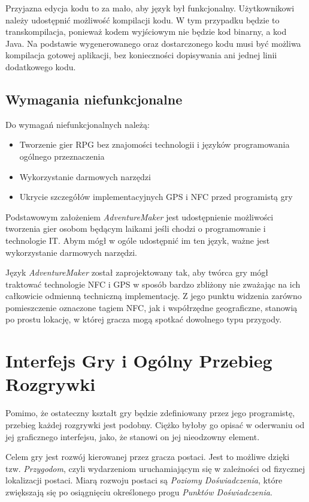 \documentclass[openright]{xmgr}
\begin{document}
Przyjazna edycja kodu to za mało, aby język był funkcjonalny. Użytkownikowi należy udostępnić możliwość kompilacji kodu. W tym przypadku będzie to transkompilacja, ponieważ kodem wyjściowym nie będzie kod binarny, a kod Java. Na podstawie wygenerowanego oraz dostarczonego kodu musi być możliwa kompilacja gotowej aplikacji, bez konieczności dopisywania ani jednej linii dodatkowego kodu. 

\section{Wymagania niefunkcjonalne}
Do wymagań niefunkcjonalnych należą:
\begin{itemize}
	\item Tworzenie gier RPG bez znajomości technologii i języków programowania ogólnego przeznaczenia
	\item Wykorzystanie darmowych narzędzi
	\item Ukrycie szczegółów implementacyjnych GPS i NFC przed programistą gry
\end{itemize}

Podstawowym założeniem \textit{AdventureMaker} jest udostępnienie możliwości tworzenia gier osobom będącym laikami jeśli chodzi o programowanie i technologie IT. Abym mógł w ogóle udostępnić im ten język, ważne jest wykorzystanie darmowych narzędzi.

Język \textit{AdventureMaker} został zaprojektowany tak, aby twórca gry mógł traktować technologie NFC i GPS w sposób bardzo zbliżony nie zważając na ich  całkowicie odmienną techniczną implementację. Z jego punktu widzenia zarówno pomieszczenie oznaczone tagiem NFC, jak i współrzędne geograficzne, stanowią po prostu lokację, w której gracza mogą spotkać dowolnego typu przygody. 

\chapter{Interfejs Gry i Ogólny Przebieg Rozgrywki}

Pomimo, że ostateczny kształt gry będzie zdefiniowany przez jego programistę, przebieg każdej rozgrywki jest podobny. Ciężko byłoby go opisać w oderwaniu od jej graficznego interfejsu, jako, że stanowi on jej nieodzowny element. 

Celem gry jest rozwój kierowanej przez gracza postaci. Jest to możliwe dzięki tzw. \textit{Przygodom}, czyli wydarzeniom uruchamiającym się w zależności od fizycznej lokalizacji postaci. Miarą rozwoju postaci są \textit{Poziomy Doświadczenia}, które zwiększają się po osiągnięciu określonego progu \textit{Punktów Doświadczenia}.
\end{document}
